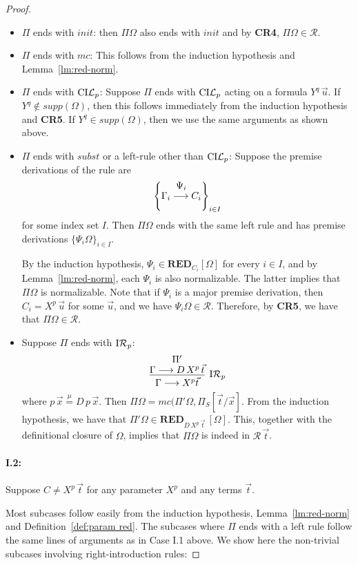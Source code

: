 \documentclass[preprint]{elsarticle}
\def\Rscr{{\mathcal R}}
\newcommand{\Seq}[2]{#1\longrightarrow #2}
\newcommand{\defmu}{\stackrel{\mu}{=}}
\newcommand{\indRP}{{\rm I}{\cal R}_p}
\newcommand{\coindLP}{{\rm CI}{\cal L}_p}
\def\RED{{\mathbf{RED}}}
\begin{document}
\begin{proof}
\begin{itemize}
\item $\Pi$ ends with $init$: then  $\Pi\Omega$ also ends with
  $init$ and by {\bf CR4}, $\Pi\Omega \in \Rscr$.

\item $\Pi$ ends with $mc$: This follows from the induction hypothesis
  and Lemma~\ref{lm:red-norm}.

\item $\Pi$ ends with $\coindLP$: Suppose $\Pi$ ends with $\coindLP$
  acting on a formula $Y^q\,\vec u$. If $Y^q \not \in supp(\Omega)$,
  then this follows immediately from the induction hypothesis and {\bf
    CR5}. If $Y^q \in supp(\Omega)$, then we use the same arguments as
  shown above.

\item $\Pi$ ends with $subst$ or a left-rule other than $\coindLP$: Suppose the
  premise derivations of the rule are
$$
\left\{ \hbox{$\deduce{\Seq {\Gamma_i}{C_i}}{\Psi_i}$} \right\}_{i \in  I}
$$
for some index set $I$. Then $\Pi\Omega$ ends with the same left rule
and has premise derivations $\{\Psi_i\Omega \}_{i\in I}$.

By the induction hypothesis, $\Psi_i \in \RED_{C_i}[\Omega]$ for every
$i\in I$, and by Lemma~\ref{lm:red-norm}, each $\Psi_i$ is also
normalizable. The latter implies that $\Pi\Omega$ is normalizable.
Note that if $\Psi_i$ is a major premise derivation, then $C_i =
X^p\,\vec u$ for some $\vec u$, and we have $\Psi_i\Omega \in \Rscr$.
Therefore, by {\bf CR5}, we have that $\Pi\Omega \in \Rscr$.

\item Suppose $\Pi$ ends with $\indRP$:
$$
\infer[\indRP] {\Seq{\Gamma}{X^p\vec t}} { \deduce{\Seq \Gamma
    {D\,X^p\,\vec t}}{\Pi'} }
$$
where $p\,\vec x \defmu D\,p\,\vec x$.  
Then $\Pi\Omega = mc(\Pi'\Omega, \Pi_S[\vec t/\vec x]$. 
From the induction hypothesis, we have that $\Pi'\Omega \in
\RED_{D\,X^p\,\vec t}\, [\Omega]$.  This, together with the definitional
closure of $\Omega$, implies that $\Pi\Omega$ is indeed in
$\Rscr\,\vec t$.


\end{itemize}

\paragraph{\bf I.2:} Suppose $C \not = X^p \,\vec t$ for any parameter
$X^p$ and any terms $\vec t$.

Most subcases follow easily from the induction hypothesis,
Lemma~\ref{lm:red-norm} and Definition~\ref{def:param red}. The
subcases where $\Pi$ ends with a left rule follow the same lines of
arguments as in Case I.1 above.  We show here the non-trivial subcases
involving right-introduction rules:


\end{proof}
\end{document}

